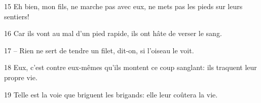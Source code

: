 
15 Eh bien, mon fils, ne marche pas avec eux, ne mets pas les pieds sur leurs sentiers!

16 Car ils vont au mal d’un pied rapide, ils ont hâte de verser le sang.

17 – Rien ne sert de tendre un filet, dit-on, si l’oiseau le voit.

18 Eux, c’est contre eux-mêmes qu’ils montent ce coup sanglant: ils traquent leur propre vie.

19 Telle est la voie que briguent les brigands: elle leur coûtera la vie.